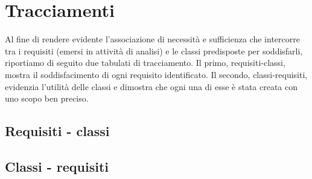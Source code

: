 \clearpage

\section{Tracciamenti}

Al fine di rendere evidente l'associazione di necessità e sufficienza che intercorre tra i requisiti (emersi in attività di analisi) e le classi predisposte per soddisfarli, riportiamo di seguito due tabulati di tracciamento. Il primo, requisiti-classi, mostra il soddisfacimento di ogni requisito identificato. Il secondo, classi-requisiti, evidenzia l'utilità delle classi e dimostra che ogni una di esse è stata creata con uno scopo ben preciso.

\subsection{Requisiti - classi}

\subsection{Classi - requisiti}

